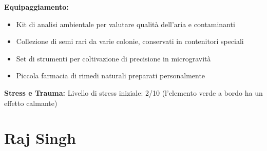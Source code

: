 \documentclass[11pt,a4paper]{article}
\begin{document}
\begin{tcolorbox}[colback=mininglightorange!20, colframe=miningorange]
\textbf{Equipaggiamento:}
\begin{itemize}[leftmargin=*]
\item Kit di analisi ambientale per valutare qualità dell'aria e contaminanti
\item Collezione di semi rari da varie colonie, conservati in contenitori speciali
\item Set di strumenti per coltivazione di precisione in microgravità
\item Piccola farmacia di rimedi naturali preparati personalmente
\end{itemize}

\textbf{Stress e Trauma:} Livello di stress iniziale: 2/10 (l'elemento verde a bordo ha un effetto calmante)
\end{tcolorbox}

\section{Raj Singh}
\end{document}
